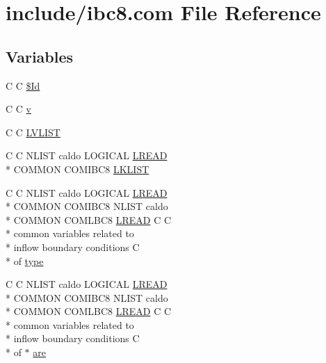 \hypertarget{home_2abonfi_2_c_f_d__codes_2_eul_f_s_83_84_2include_2ibc8_8com}{\section{include/ibc8.com File Reference}
\label{home_2abonfi_2_c_f_d__codes_2_eul_f_s_83_84_2include_2ibc8_8com}
}
\subsection*{Variables}
\begin{DoxyCompactItemize}
\item 
C C \hyperlink{home_2abonfi_2_c_f_d__codes_2_eul_f_s_83_84_2include_2ibc8_8com_af40bd3a96fc1553c00422342f92046b8}{\$\-Id}
\item 
C C \hyperlink{home_2abonfi_2_c_f_d__codes_2_eul_f_s_83_84_2include_2ibc8_8com_a8961853e9a171af64fe80e35da93a2e0}{v}
\item 
C C \hyperlink{home_2abonfi_2_c_f_d__codes_2_eul_f_s_83_84_2include_2ibc8_8com_aa711cf0c6b8e59731943e29410730275}{L\-V\-L\-I\-S\-T}
\item 
C C N\-L\-I\-S\-T caldo L\-O\-G\-I\-C\-A\-L \hyperlink{home_2abonfi_2_c_f_d__codes_2_eul_f_s_83_84_2include_2flags_8com_aea278b60e9a744704973b7b8aecd9442}{L\-R\-E\-A\-D} \\*
C\-O\-M\-M\-O\-N C\-O\-M\-I\-B\-C8 \hyperlink{home_2abonfi_2_c_f_d__codes_2_eul_f_s_83_84_2include_2ibc8_8com_ad61abb12bb3aea850116ed8eb2156f2b}{L\-K\-L\-I\-S\-T}
\item 
C C N\-L\-I\-S\-T caldo L\-O\-G\-I\-C\-A\-L \hyperlink{home_2abonfi_2_c_f_d__codes_2_eul_f_s_83_84_2include_2flags_8com_aea278b60e9a744704973b7b8aecd9442}{L\-R\-E\-A\-D} \\*
C\-O\-M\-M\-O\-N C\-O\-M\-I\-B\-C8 N\-L\-I\-S\-T caldo \\*
C\-O\-M\-M\-O\-N C\-O\-M\-L\-B\-C8 \hyperlink{home_2abonfi_2_c_f_d__codes_2_eul_f_s_83_84_2include_2flags_8com_aea278b60e9a744704973b7b8aecd9442}{L\-R\-E\-A\-D} C C \\*
common variables related to \\*
inflow boundary conditions C \\*
of \hyperlink{home_2abonfi_2_c_f_d__codes_2_eul_f_s_83_84_2include_2ibc8_8com_a631c5c1ddd478437aa8e7f1d42a3b59d}{type}
\item 
C C N\-L\-I\-S\-T caldo L\-O\-G\-I\-C\-A\-L \hyperlink{home_2abonfi_2_c_f_d__codes_2_eul_f_s_83_84_2include_2flags_8com_aea278b60e9a744704973b7b8aecd9442}{L\-R\-E\-A\-D} \\*
C\-O\-M\-M\-O\-N C\-O\-M\-I\-B\-C8 N\-L\-I\-S\-T caldo \\*
C\-O\-M\-M\-O\-N C\-O\-M\-L\-B\-C8 \hyperlink{home_2abonfi_2_c_f_d__codes_2_eul_f_s_83_84_2include_2flags_8com_aea278b60e9a744704973b7b8aecd9442}{L\-R\-E\-A\-D} C C \\*
common variables related to \\*
inflow boundary conditions C \\*
of $\ast$ \hyperlink{home_2abonfi_2_c_f_d__codes_2_eul_f_s_83_84_2include_2ibc8_8com_a7f7721a0bb3c1d35cfbfbcfd6efc1548}{are}
\end{DoxyCompactItemize}


